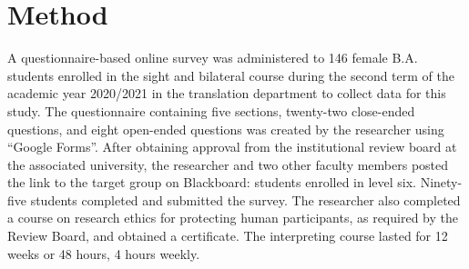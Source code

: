\documentclass[english]{textolivre}
\begin{document}
\section{Method}\label{sec-normas}
A questionnaire-based online survey was administered to 146 female B.A. students enrolled in the sight and bilateral course during the second term of the academic year 2020/2021 in the translation department to collect data for this study. The questionnaire containing five sections, twenty-two close-ended questions, and eight open-ended questions was created by the researcher using “Google Forms”. After obtaining approval from the institutional review board at the associated university, the researcher and two other faculty members posted the link to the target group on Blackboard: students enrolled in level six. Ninety-five students completed and submitted the survey. The researcher also completed a course on research ethics for protecting human participants, as required by the Review Board, and obtained a certificate. The interpreting course lasted for 12 weeks or 48 hours, 4 hours weekly.
\end{document}

